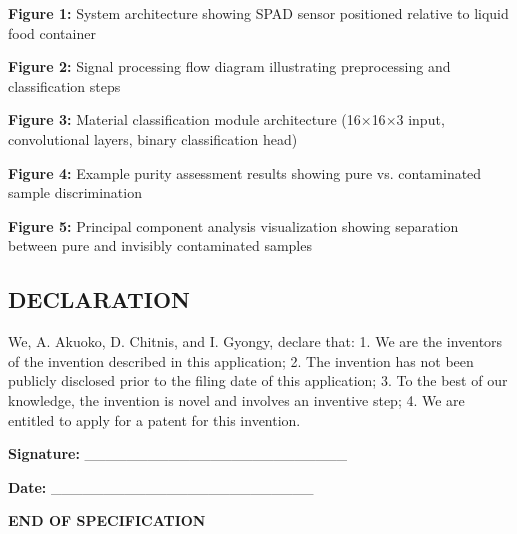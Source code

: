 \documentclass[11pt,a4paper]{article}
\begin{document}
\begin{enumerate}[leftmargin=*,label=\alph*)]
\textbf{Figure 1:} System architecture showing SPAD sensor positioned relative to liquid food container

\textbf{Figure 2:} Signal processing flow diagram illustrating preprocessing and classification steps

\textbf{Figure 3:} Material classification module architecture (16$\times$16$\times$3 input, convolutional layers, binary classification head)

\textbf{Figure 4:} Example purity assessment results showing pure vs. contaminated sample discrimination

\textbf{Figure 5:} Principal component analysis visualization showing separation between pure and invisibly contaminated samples

\vspace{0.5em}
\subsection{DECLARATION}

We, A. Akuoko, D. Chitnis, and I. Gyongy, declare that:
1. We are the inventors of the invention described in this application;
2. The invention has not been publicly disclosed prior to the filing date of this application;
3. To the best of our knowledge, the invention is novel and involves an inventive step;
4. We are entitled to apply for a patent for this invention.

\textbf{Signature:} _________________________

\textbf{Date:} _________________________

\vspace{0.5em}
\textbf{END OF SPECIFICATION}

\end{enumerate}
\end{document}
